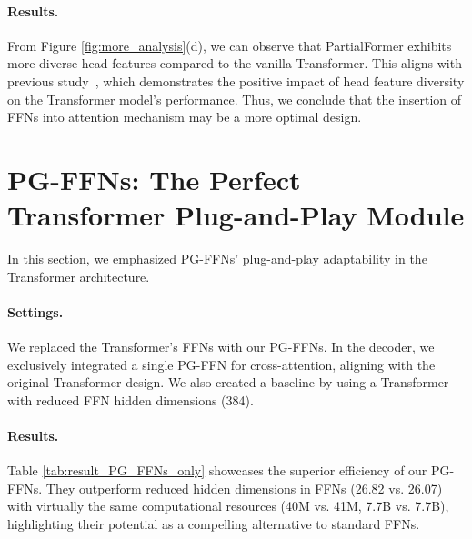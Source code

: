 \documentclass[11pt]{article}
\begin{document}
\paragraph{Results.}
From Figure \ref{fig:more_analysis}(d), we can observe that PartialFormer exhibits more diverse head features compared to the vanilla Transformer. This aligns with previous study~\cite{li-etal-2018-multi-head}, which demonstrates the positive impact of head feature diversity on the Transformer model's performance. Thus, we conclude that the insertion of FFNs into attention mechanism may be a more optimal design.   



\begin{table}[t!]
    \centering
    \renewcommand{\arraystretch}{1}
\centering
\small

\setlength{\tabcolsep}{1pt}
    \caption{PG-FFNs offer a compelling alternative to vanilla FFNs. Metrics are reported on WMT'14 En-De. }
    \label{tab:result_PG_FFNs_only}
\end{table}


\section{PG-FFNs: The Perfect Transformer Plug-and-Play Module}
In this section, we emphasized PG-FFNs' plug-and-play adaptability in the Transformer architecture.
\paragraph{Settings.} We replaced the Transformer's FFNs with our PG-FFNs. In the decoder, we exclusively integrated a single PG-FFN for cross-attention, aligning with the original Transformer design. We also created a baseline by using a Transformer with reduced FFN hidden dimensions (384).

\paragraph{Results.}
Table \ref{tab:result_PG_FFNs_only} showcases the superior efficiency of our PG-FFNs. They outperform reduced hidden dimensions in FFNs (26.82 vs. 26.07) with virtually the same computational resources (40M vs. 41M, 7.7B vs. 7.7B), highlighting their potential as a compelling alternative to standard FFNs.
\end{document}
